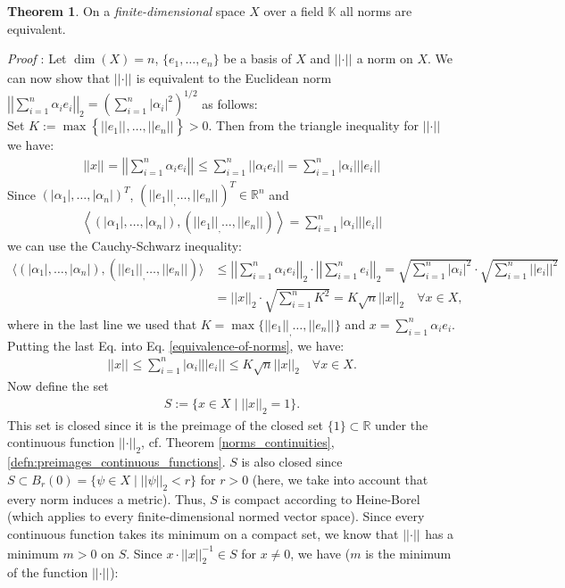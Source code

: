 \documentclass[12pt, a4paper]{article}
\numberwithin{equation}{section}
\theoremstyle{definition}
\theoremstyle{definition}
\newtheorem{theorem}[thm]{Theorem}
\newcommand{\norm}[2]{\left\vert\left\vert #1 \right\vert\right\vert_{#2}}
\newcommand{\abs}[1]{\left\vert #1 \right\vert}
\begin{document}
	\begin{theorem}\label{finite_dimensional_norm_equivalence}
		On a \textit{finite-dimensional} space $X$ over a field $\mathbb{K}$ all norms are equivalent. 
	\end{theorem}
	\noindent\textit{Proof \cite[p. 27f.]{werner-fa}}: Let $\dim(X) = n$, $\{e_1, \dots, e_n\}$ be a basis of $X$ and $\norm{\cdot}{}$ a norm on $X$. We can now show that $\norm{\cdot}{}$ is equivalent to the Euclidean norm $\norm{\sum_{i = 1}^n\alpha_ie_i}{2} = \left( \sum_{i = 1}^{n}\left\vert \alpha_i \right\vert^2 \right)^{1/2}$ as follows: \\[6pt] Set $K:= \max\left\{ \norm{e_1}{}, \dots, \norm{e_n}{}\right\} > 0$. Then from the triangle inequality for $\norm{\cdot}{}$ we have: 
	\begin{align}\label{equivalence-of-norms}
		\norm{x}{} = \norm{\sum_{i= 1}^{n}\alpha_ie_i}{} \leq \sum_{i= 1}^n \norm{\alpha_ie_i}{} = \sum_{i= 1}^n \abs{\alpha_i} \norm{e_i}{}
	\end{align}
	Since $(\abs{\alpha_1}, \dots, \abs{\alpha_n})^T$, $(\norm{e_1}, \dots, \norm{e_n}{})^T\in \mathbb R^n$ and 
	\begin{align}
		\left\langle \left(\abs{\alpha_1}, \dots, \abs{\alpha_n}\right), (\norm{e_1}, \dots, \norm{e_n}{} ) \right\rangle = \sum_{i = 1}^n \abs{\alpha_i}\norm{e_i}{}
	\end{align}
	we can use the Cauchy-Schwarz inequality: 
	\begin{align}
		\langle (\abs{\alpha_1}, \dots, \abs{\alpha_n}), (\norm{e_1}, \dots, \norm{e_n}{} ) \rangle &\leq \norm{\sum_{i=1}^n \alpha_ie_i}{2}\cdot \norm{\sum_{i= 1}^n e_i}{2} = \sqrt{\sum_{i = 1}^n\abs{\alpha_i}^2} \cdot \sqrt{\sum_{i = 1}^n\norm{e_i}{}^2}
		\\[8pt] &= \norm{x}{2}\cdot \sqrt{\sum_{i=1}^n K^2} = K\sqrt{n}\norm{x}{2} \quad \forall x\in X, 
	\end{align}
	where in the last line we used that $K = \max\{\norm{e_1}, \dots, \norm{e_n}{}\}$ and $x = \sum_{i = 1}^n \alpha_i e_i$. Putting the last Eq. into Eq. \eqref{equivalence-of-norms}, we have: 
	\begin{align}\label{fa_equiv_norms_intermed_1}
		\norm{x}{} \leq \sum_{i=1}^{n} \abs{\alpha_i}\norm{e_i}{} \leq K\sqrt{n}\norm{x}{2} \quad \forall x\in X.
	\end{align}
	Now define the set 
	\begin{align}
		S:= \{ x\in X \mid \norm{x}{2} = 1 \}. 
	\end{align}
	This set is closed since it is the preimage of the closed set $\{1\}\subset \mathbb R$ under the continuous function $\norm{\cdot}{2}$, cf. Theorem \ref{norms_continuities}, \ref{defn:preimages_continuous_functions}. $S$ is also closed since $S\subset B_{r}(0) = \{\psi\in X\mid \norm{\psi}{2} < r\}$ for $r>0$ (here, we take into account that every norm induces a metric). Thus, $S$ is compact according to Heine-Borel (which applies to every finite-dimensional normed vector space). Since every continuous function takes its minimum on a compact set, we know that $\norm{\cdot}{}$ has a minimum $m > 0$ on $S$. Since $x\cdot \norm{x}{2}^{-1}\in S$ for $x\ne 0$, we have ($m$ is the minimum of the function $\norm{\cdot}{}$): 
\end{document}
